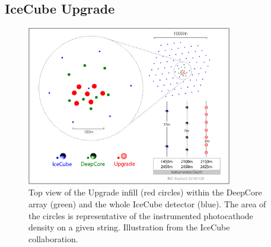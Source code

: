 
\subsection{IceCube Upgrade}
\label{subsec:upgrade}
\begin{figure}[t]
\centering
\includegraphics[width=0.8\textwidth]{chapter5/img/ICUpgradeLayout_V3.jpg}
\caption{Top view of the Upgrade infill (red circles) within the DeepCore array (green) and the whole IceCube detector (blue). The area of the circles is representative of the instrumented photocathode density on a given string. Illustration from the IceCube collaboration.}
\label{fig:upgrade}
\end{figure}

